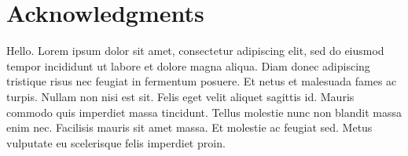 
\chapter*{Acknowledgments}
Hello.
Lorem ipsum dolor sit amet, consectetur adipiscing elit, sed do eiusmod tempor incididunt ut labore et dolore magna aliqua. Diam donec adipiscing tristique risus nec feugiat in fermentum posuere. Et netus et malesuada fames ac turpis. Nullam non nisi est sit. Felis eget velit aliquet sagittis id. Mauris commodo quis imperdiet massa tincidunt. Tellus molestie nunc non blandit massa enim nec. Facilisis mauris sit amet massa. Et molestie ac feugiat sed. Metus vulputate eu scelerisque felis imperdiet proin.


